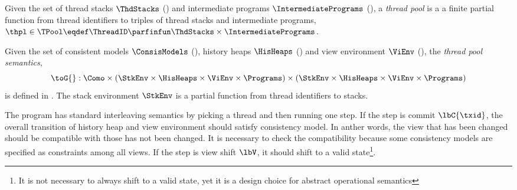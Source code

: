 
{ \color{gray}
\begin{defn}
\label{def:thread_pools}
Given the set of thread stacks $\ThdStacks$ () and intermediate programs $\IntermediatePrograms$ (), a \emph{thread pool} is a a finite partial function from thread identifiers to triples of thread stacks and intermediate programs, \(\thpl \in \TPool \eqdef \ThreadID \parfinfun \ThdStacks \times \IntermediatePrograms\).
\end{defn}
}
 
\begin{defn} 
\label{def:thread_pool_semantics}
\label{def:program_semantics}
Given the set of consistent models \( \ConsisModels \) (), history heaps \(\HisHeaps\) () and view environment \(\ViEnv \) (), the \emph{thread pool semantics}, 
\[
	\toG{} : \Como 
    \times ( \StkEnv \times \HisHeaps \times \ViEnv \times \Programs) 
    \times ( \StkEnv \times \HisHeaps \times \ViEnv \times \Programs) 
\]
is defined in .
The stack environment \( \StkEnv \) is a partial function from thread identifiers to stacks.
\end{defn}
 
The program has standard interleaving semantics by picking a thread and then running one step.
If the step is commit \( \lbC{\txid} \), the overall transition of history heap and view environment should satisfy consistency model.
In anther words, the view that has been changed should be compatible with those has not been changed.
It is necessary to check the compatibility because some consistency models are specified as constraints among all views.
If the step is view shift \( \lbV \), it should shift to a valid state\footnote{It is not necessary to always shift to a valid state, yet it is a design choice for abstract operational semantics}.
 

